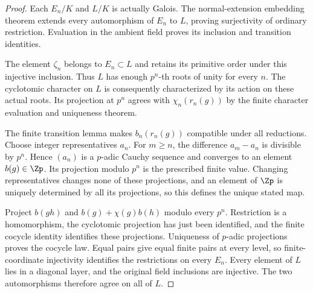 \begin{proof}
Each $E_n/K$ and $L/K$ is actually Galois. The normal-extension
embedding theorem extends every automorphism of $E_n$ to $L$, proving
surjectivity of ordinary restriction. Evaluation in the ambient field
proves its inclusion and transition identities.

The element $\zeta_n$ belongs to $E_n\subset L$ and retains its
primitive order under this injective inclusion. Thus $L$ has enough
$p^n$-th roots of unity for every $n$. The cyclotomic character on
$L$ is consequently characterized by its action on these actual roots.
Its projection at $p^n$ agrees with $\chi_n(r_n(g))$ by the finite
character evaluation and uniqueness theorem.

The finite transition lemma makes $b_n(r_n(g))$ compatible under all
reductions. Choose integer representatives $a_n$. For $m\geq n$,
the difference $a_m-a_n$ is divisible by $p^n$. Hence $(a_n)$ is a
$p$-adic Cauchy sequence and converges to an element $b(g)\in\Zp$.
Its projection modulo $p^n$ is the prescribed finite value. Changing
representatives changes none of these projections, and an element of
$\Zp$ is uniquely determined by all its projections, so this defines
the unique stated map.

Project $b(gh)$ and $b(g)+\chi(g)b(h)$ modulo every $p^n$.
Restriction is a homomorphism, the cyclotomic projection has just been
identified, and the finite cocycle identity identifies these
projections. Uniqueness of $p$-adic projections proves the cocycle law.
Equal pairs give equal finite pairs at every level, so finite-coordinate
injectivity identifies the restrictions on every $E_n$. Every element
of $L$ lies in a diagonal layer, and the original field inclusions are
injective. The two automorphisms therefore agree on all of $L$.
\end{proof}

